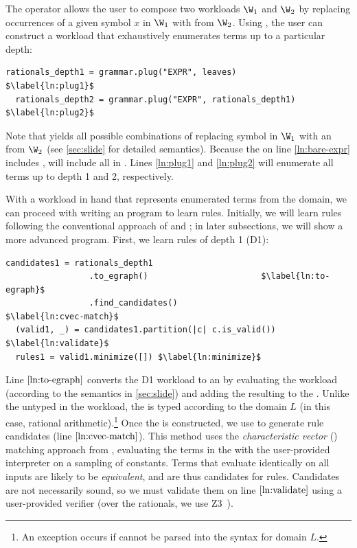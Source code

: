The  operator allows the user to compose two workloads
 $\W_1$ and $\W_2$ by replacing occurrences of a given symbol $x$
 in $\W_1$ with \sexps from $\W_2$.
Using ,
 the user can construct a workload that exhaustively enumerates terms
 up to a particular depth:

\begin{lstlisting}[name=overview]
  rationals_depth1 = grammar.plug("EXPR", leaves)           $\label{ln:plug1}$
  rationals_depth2 = grammar.plug("EXPR", rationals_depth1) $\label{ln:plug2}$
\end{lstlisting}

Note that  yields
 all possible combinations of replacing symbol  in $\W_1$ with an \sexp from $\W_2$
 (see \autoref{sec:slide} for detailed semantics).
Because the  on line \ref{ln:bare-expr} includes ,
 will include all \sexps in .
Lines \ref{ln:plug1} and \ref{ln:plug2}
 will enumerate all terms up to depth 1 and 2, respectively.

With a workload in hand
 that represents enumerated terms from the domain,
 we can proceed with writing an \enumo program to learn rules.
Initially,
 we will learn rules following
 the conventional approach
 of \citet{ruler} and \citet{sat19};
 in later subsections, we will show a more advanced \enumo program.
First, we learn rules of depth 1 (D1):

\begin{lstlisting}[name=overview]
  candidates1 = rationals_depth1
                 .to_egraph()                       $\label{ln:to-egraph}$
                 .find_candidates()                     $\label{ln:cvec-match}$
  (valid1, _) = candidates1.partition(|c| c.is_valid()) $\label{ln:validate}$
  rules1 = valid1.minimize([]) $\label{ln:minimize}$
\end{lstlisting}

Line $\ref{ln:to-egraph}$ converts the D1 workload to an \egraph
 by evaluating the workload (according to the semantics in \autoref{sec:slide})
 and adding the resulting \sexps to the \egraph.
Unlike the untyped \sexps in the workload,
 the \egraph is typed according to the domain $L$
 (in this case, rational arithmetic).\footnote{
  An exception occurs if \sexps cannot be parsed into the syntax for domain $L$.
 }
Once the \egraph is constructed,
 we use 
 to generate rule candidates (line $\ref{ln:cvec-match}$).
This method uses the \emph{characteristic vector} (\cvec) matching
 approach from \citet{ruler},
 evaluating the terms in the \egraph
 with the user-provided interpreter on a sampling of constants.
Terms that evaluate identically on all inputs
 are likely to be \textit{equivalent}, and are thus candidates for rules.
Candidates are not necessarily sound,
 so we must validate them on line $\ref{ln:validate}$
 using a user-provided verifier
 (over the rationals, we use Z3~\citep{z3}).

